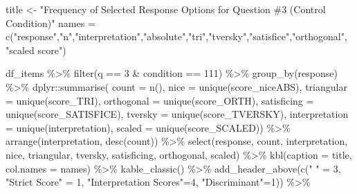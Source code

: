 \documentclass[
  letterpaper,
  DIV=11,
  numbers=noendperiod]{scrreprt}
\newenvironment{Shaded}{\begin{snugshade}}{\end{snugshade}}
\newcommand{\AttributeTok}[1]{\textcolor[rgb]{0.40,0.45,0.13}{#1}}
\newcommand{\DecValTok}[1]{\textcolor[rgb]{0.68,0.00,0.00}{#1}}
\newcommand{\FunctionTok}[1]{\textcolor[rgb]{0.28,0.35,0.67}{#1}}
\newcommand{\NormalTok}[1]{\textcolor[rgb]{0.00,0.23,0.31}{#1}}
\newcommand{\OtherTok}[1]{\textcolor[rgb]{0.00,0.23,0.31}{#1}}
\newcommand{\SpecialCharTok}[1]{\textcolor[rgb]{0.37,0.37,0.37}{#1}}
\newcommand{\StringTok}[1]{\textcolor[rgb]{0.13,0.47,0.30}{#1}}
\begin{document}
\begin{Shaded}
\begin{Highlighting}[]
\NormalTok{title }\OtherTok{\textless{}{-}} \StringTok{"Frequency of Selected Response Options for Question \#3 (Control Condition)"}
\NormalTok{names }\OtherTok{=} \FunctionTok{c}\NormalTok{(}\StringTok{"response"}\NormalTok{,}\StringTok{"n"}\NormalTok{,}\StringTok{"interpretation"}\NormalTok{,}\StringTok{"absolute"}\NormalTok{,}\StringTok{"tri"}\NormalTok{,}\StringTok{"tversky"}\NormalTok{,}\StringTok{"satisfice"}\NormalTok{,}\StringTok{"orthogonal"}\NormalTok{, }\StringTok{"scaled score"}\NormalTok{)}

\NormalTok{df\_items }\SpecialCharTok{\%\textgreater{}\%} \FunctionTok{filter}\NormalTok{(q }\SpecialCharTok{==} \DecValTok{3} \SpecialCharTok{\&}\NormalTok{ condition }\SpecialCharTok{==} \DecValTok{111}\NormalTok{) }\SpecialCharTok{\%\textgreater{}\%} \FunctionTok{group\_by}\NormalTok{(response) }\SpecialCharTok{\%\textgreater{}\%} 
\NormalTok{  dplyr}\SpecialCharTok{::}\FunctionTok{summarise}\NormalTok{( }\AttributeTok{count =} \FunctionTok{n}\NormalTok{(), }
                    \AttributeTok{nice =} \FunctionTok{unique}\NormalTok{(score\_niceABS),}
                    \AttributeTok{triangular =} \FunctionTok{unique}\NormalTok{(score\_TRI), }
                    \AttributeTok{orthogonal =}  \FunctionTok{unique}\NormalTok{(score\_ORTH),}
                    \AttributeTok{satisficing =}  \FunctionTok{unique}\NormalTok{(score\_SATISFICE),}
                    \AttributeTok{tversky =} \FunctionTok{unique}\NormalTok{(score\_TVERSKY),}
                    \AttributeTok{interpretation =} \FunctionTok{unique}\NormalTok{(interpretation),}
                    \AttributeTok{scaled =} \FunctionTok{unique}\NormalTok{(score\_SCALED)) }\SpecialCharTok{\%\textgreater{}\%} 
  \FunctionTok{arrange}\NormalTok{(interpretation, }\FunctionTok{desc}\NormalTok{(count)) }\SpecialCharTok{\%\textgreater{}\%} 
  \FunctionTok{select}\NormalTok{(response, count, interpretation, nice, }
\NormalTok{         triangular, tversky, satisficing, orthogonal, scaled) }\SpecialCharTok{\%\textgreater{}\%} 
  \FunctionTok{kbl}\NormalTok{(}\AttributeTok{caption =}\NormalTok{ title, }\AttributeTok{col.names =}\NormalTok{ names) }\SpecialCharTok{\%\textgreater{}\%}  \FunctionTok{kable\_classic}\NormalTok{() }\SpecialCharTok{\%\textgreater{}\%} 
  \FunctionTok{add\_header\_above}\NormalTok{(}\FunctionTok{c}\NormalTok{(}\StringTok{" "} \OtherTok{=} \DecValTok{3}\NormalTok{, }\StringTok{"Strict Score"} \OtherTok{=} \DecValTok{1}\NormalTok{, }\StringTok{"Interpretation Scores"}\OtherTok{=}\DecValTok{4}\NormalTok{, }\StringTok{"Discriminant"}\OtherTok{=}\DecValTok{1}\NormalTok{)) }\SpecialCharTok{\%\textgreater{}\%}

\end{Highlighting}
\end{Shaded}
\end{document}
